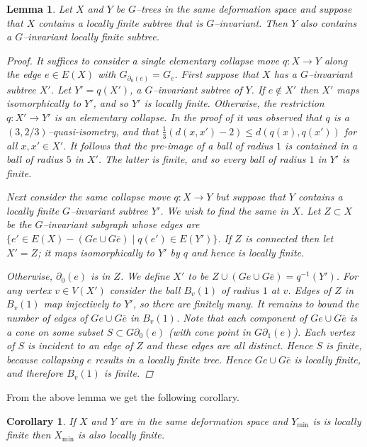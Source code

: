 \documentclass[12pt,parskip=full]{report}
\theoremstyle{plain}
\newtheorem{lem}[thm]{Lemma}
\newtheorem{cor}[thm]{Corollary}
\theoremstyle{definition}
\begin{document}
\begin{lem}
    
    
    
    Let $X$ and $Y$ be $G$--trees in the same deformation space and
suppose that $X$ contains a locally finite subtree that is
$G$--invariant. Then $Y$ also contains a $G$--invariant locally finite
subtree. 
    \begin{proof}
        It suffices to consider a single elementary collapse move \(q\colon X \to Y\)
along the edge $e \in E(X)$ with $G_{\partial_0 (e)} = G_e$. First
suppose that $X$ has a $G$--invariant subtree $X'$. Let $Y' = q(X')$,
a $G$--invariant subtree of $Y$. If $e \not\in X'$ then $X'$ maps
isomorphically to $Y'$, and so $Y'$ is locally finite. Otherwise, 
the restriction $q\colon X' \to Y'$ is an elementary collapse. In the
proof of \cite[Theorem 7.3]{foresterdeformationrigidity} it was observed that $q$ is a
$(3, 2/3)$--quasi-isometry, and that $\frac{1}{3}(d(x,x') - 2) \leq
d(q(x),q(x'))$ for all $x,x'\in X'$. It follows that the pre-image of
a ball of radius $1$ is contained in a ball of radius $5$ in $X'$. The
latter is finite, and so every ball of radius $1$ in $Y'$ is finite. 

Next consider the same collapse move $q\colon X \to Y$ but suppose that
$Y$ contains a locally finite $G$--invariant subtree
$Y'$. We wish to find the same in $X$. Let $Z \subset X$ be the
$G$--invariant subgraph whose edges are $\{ e' \in E(X) - (Ge \cup
G\overline{e}) \mid q(e') \in E(Y')\}$. If $Z$ is connected then let
$X' = Z$; it maps isomorphically to $Y'$ by $q$ and hence is locally
finite. 


Otherwise, $\partial_0(e)$ is in $Z$. We define $X'$ to be
$Z \cup (Ge \cup G\overline{e}) = q^{-1}(Y')$. For any vertex
$v\in V(X')$ consider the ball $B_v(1)$ of radius $1$ at $v$. Edges of
$Z$ in $B_v(1)$ map injectively to $Y'$, so there are finitely
many. It remains to bound the number of edges of $Ge \cup
G\overline{e}$ in $B_v(1)$. 
Note that each component of $Ge \cup G\overline{e}$ is a cone on some
subset $S \subset G \partial_0(e)$ (with cone point in $G
\partial_1(e)$). Each vertex of $S$ is incident to an edge of $Z$
and these edges are all distinct. Hence $S$ is finite, because
collapsing $e$ results in a locally finite tree. Hence $Ge \cup
G\overline{e}$ is locally finite, and therefore $B_v(1)$ is finite. 
    \end{proof}
\end{lem}

From the above lemma we get the following corollary.
\begin{cor}
    \label{lem:pullbacklocallyfinite}
    If \(X\) and \(Y\) are in the same deformation space and \(Y_\text{min}\) is is locally finite then \(X_\text{min}\) is also locally finite.
\end{cor}
\end{document}
